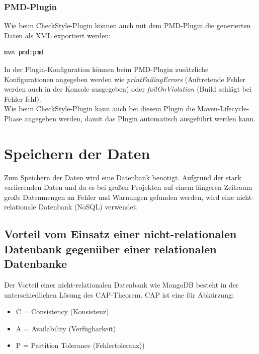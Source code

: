 \subsubsection{PMD-Plugin}
Wie beim CheckStyle-Plugin können auch mit dem PMD-Plugin die generierten Daten als XML exportiert werden:
\begin{verbatim}
mvn pmd:pmd
\end{verbatim}
In der Plugin-Konfiguration können beim PMD-Plugin zusätzliche Konfigurationen angegeben werden wie \textit{printFailingErrors}  (Auftretende Fehler werden auch in der Konsole ausgegeben) oder \textit{failOnViolation} (Build schlägt bei Fehler fehl). \\
Wie beim CheckStyle-Plugin kann auch bei diesem Plugin die Maven-Lifecycle-Phase angegeben werden, damit das Plugin automatisch ausgeführt werden kann.

\section{Speichern der Daten} 

Zum Speichern der Daten wird eine Datenbank benötigt. Aufgrund der stark variierenden Daten und da es bei großen Projekten auf einem längeren Zeitraum große Datenmengen an Fehler und Warnungen gefunden werden, wird eine nicht-relationale Datenbank (NoSQL) verwendet. 

\subsection{Vorteil vom Einsatz einer nicht-relationalen Datenbank gegenüber einer relationalen Datenbanke }
Der Vorteil einer nicht-relationalen Datenbank wie MongoDB besteht in der unterschiedlichen Lösung des CAP-Theorem. CAP ist eine für Abkürzung:

\begin{itemize}
\item C = Consistency (Konsistenz)
\item A = Availability (Verfügbarkeit) 
\item P = Partition Tolerance (Fehlertoleranz))
\end{itemize}

